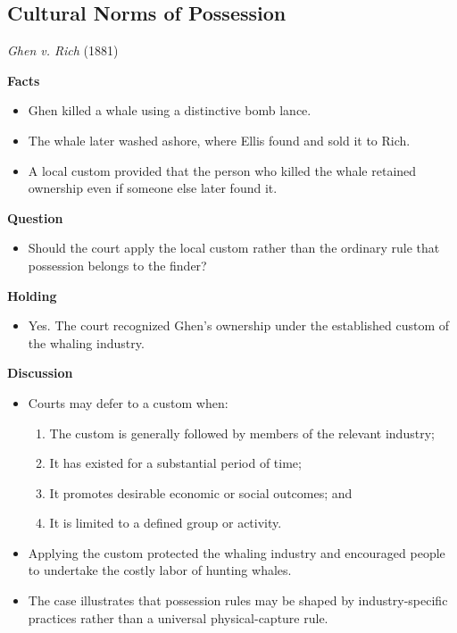 \documentclass[11pt]{tex/lawoutline}
\begin{document}
\subsection{Cultural Norms of Possession}

\casebox
{\textit{Ghen v. Rich} (1881)}
{}
{
\textbf{Facts}
\begin{itemize}
    \item Ghen killed a whale using a distinctive bomb lance.
    \item The whale later washed ashore, where Ellis found and sold it to Rich.
    \item A local custom provided that the person who killed the whale retained ownership even if someone else later found it.
\end{itemize}

\textbf{Question}
\begin{itemize}
    \item Should the court apply the local custom rather than the ordinary rule that possession belongs to the finder?
\end{itemize}

\textbf{Holding}
\begin{itemize}
    \item Yes. The court recognized Ghen's ownership under the established custom of the whaling industry.
\end{itemize}

\textbf{Discussion}
\begin{itemize}
    \item Courts may defer to a custom when:
    \begin{enumerate}
        \item The custom is generally followed by members of the relevant industry;
        \item It has existed for a substantial period of time;
        \item It promotes desirable economic or social outcomes; and
        \item It is limited to a defined group or activity.
    \end{enumerate}
    \item Applying the custom protected the whaling industry and encouraged people to undertake the costly labor of hunting whales.
    \item The case illustrates that possession rules may be shaped by industry-specific practices rather than a universal physical-capture rule.
\end{itemize}
}
\end{document}
